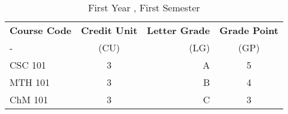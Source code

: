 \documentclass{article}
\begin{document}
	\begin{table}[h!]
	\begin{center}
		\caption{First Year , First Semester}
		\label{tab:table1}
		\begin{tabular}{l|c|r|c}
		\textbf{Course Code} & \textbf{Credit Unit} &
		\textbf{Letter Grade} & \textbf{Grade Point}\\
		- & (CU) & (LG) & (GP)\\
		\hline
		CSC 101 & 3 & A & 5\\
		MTH 101 & 3 & B & 4\\
		ChM 101 & 3 & C & 3\\
		\end{tabular}
		
	\end{center}
\end{table}
\end{document}
